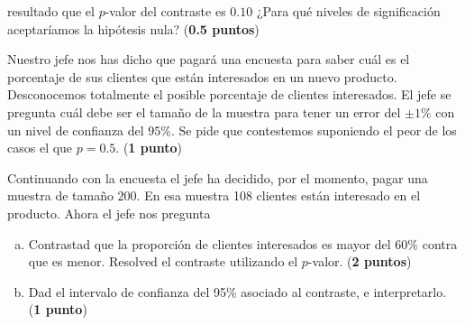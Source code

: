 \documentclass[10pt]{article}
\newcounter{problemes}
\newcounter{punts} \def\thepunts{\arabic{punts}}
\def\probl{\addtocounter{problemes}{1} \setcounter{punts}{0}
\medskip\noindent{\bf \theproblemes) }}
\newif\ifsol
\begin{document}
resultado que el $p$-valor del contraste es $0.10$ ¿Para qué niveles de significación aceptaríamos la hipótesis nula? (\textbf{0.5 puntos})

\ifsol
{\sf
\textbf{Solución:}



Aceptamos las hipótesis nula del contraste para todos los niveles de significación $\alpha$ menores que $0.10$


}
\fi


\probl  Nuestro jefe nos has dicho  que pagará una encuesta para saber cuál es el porcentaje de sus clientes que  están interesados en un nuevo producto. Desconocemos totalmente el posible porcentaje de clientes interesados.
El jefe se pregunta cuál debe ser el tamaño de la muestra para tener un error del $\pm 1\%$ con un nivel de confianza del $95\%$. Se pide que contestemos suponiendo el peor de los casos el que $p=0.5$. (\textbf{1 punto})

\ifsol
{\sf
\textbf{Solución:}


La amplitud del intervalos es $A_0=0.02$, $1-\alpha=0.95$, $1-\alpha=0.025$, $1-\frac{\alpha}{2}=0.975$ $z_{0.975}=1.959964$ con las tablas $1.96$. 

Supuesto el  peor caso que la proporción poblacional sea $p=0.5$ sabemos que el tamaño de la muestra  buscado es 

$$n=\left\lceil\frac{z_{1-\frac{\alpha}{2}}^2}{A_0^2}\right\rceil\approx\left\lceil\frac{1.96^2}{0.02^2}\right\rceil=9604.$$


Con código  R

\begin{Schunk}
\begin{Sinput}
> n=ceiling(qnorm(1-0.05/2)^2/0.02^2)
> n
\end{Sinput}
\begin{Soutput}
[1] 9604
\end{Soutput}
\end{Schunk}
}

\fi


\probl  Continuando con la encuesta el jefe ha decidido, por el momento, pagar una muestra de  tamaño $200$. En esa muestra 108 clientes están interesado en el producto. Ahora el jefe nos pregunta


\begin{enumerate}[a)]
\item Contrastad  que la proporción de clientes interesados es mayor del 60\% contra que es menor. Resolved el contraste utilizando el $p$-valor. (\textbf{2 puntos})
\item Dad el  intervalo de confianza del 95\%  asociado al contraste, e interpretarlo. (\textbf{1 punto})
\end{enumerate}
\end{document}
